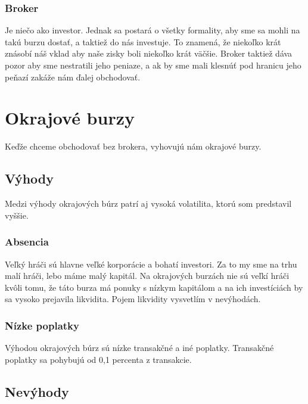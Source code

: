 \subsubsection{Broker} 
Je niečo ako investor. Jednak sa postará o všetky formality, aby sme sa mohli na takú burzu dostať, a taktiež do nás investuje. To znamená, že niekoľko krát znásobí náš vklad aby naše zisky boli niekoľko krát väčšie. Broker taktiež dáva pozor aby sme nestratili jeho peniaze, a ak by sme mali klesnúť pod hranicu jeho peňazí zakáže nám ďalej obchodovať. \cite{ZAC}  
\section{Okrajové burzy}
Keďže chceme obchodovať bez brokera, vyhovujú nám okrajové burzy.
\subsection{Výhody} 
Medzi výhody okrajových búrz patrí aj vysoká volatilita, ktorú som predstavil vyššie.
\subsubsection{Absencia } 
Veľký hráči\cite{ZAC} sú hlavne veľké korporácie a bohatí investori. Za to my sme na trhu malí hráči, lebo máme malý kapitál. Na okrajových burzách nie sú veľkí hráči kvôli tomu, že táto burza má ponuky s nízkym kapitálom a na ich investíciách by sa vysoko prejavila likvidita. Pojem likvidity vysvetlím v nevýhodách.
\subsubsection{Nízke poplatky} 
Výhodou okrajových búrz sú nízke transakčné a iné poplatky. Transakčné poplatky sa pohybujú od 0,1 percenta z transakcie. 
\subsection{Nevýhody} 
